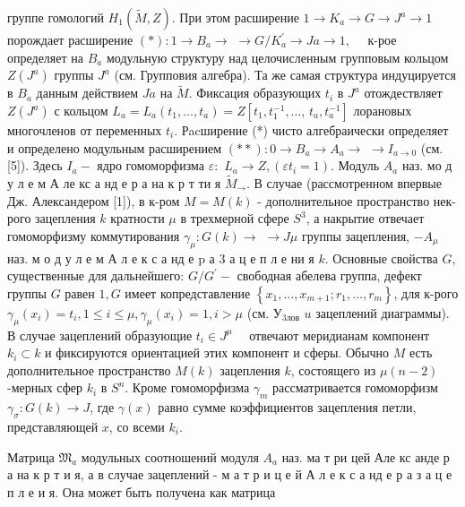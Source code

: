 \documentclass[10pt]{article}
\begin{document}
группе гомологий $H_{1}(\tilde{M}, Z)$. При этом расширение $1 \rightarrow K_{a} \rightarrow G \rightarrow J^{a} \rightarrow 1$ порождает расширение $(*): 1 \rightarrow B_{a} \rightarrow$ $\rightarrow G / K_{a}^{\prime} \rightarrow J a \rightarrow 1, \quad$ к-рое определяет на $B_{a}$ модульную структуру над целочисленным групповым кольцом $Z\left(J^{a}\right)$ группы $J^{a}$ (см. Групповия алгебра). Та же самая структура индуцируется в $B_{a}$ данным действием $J a$ на $\tilde{M}$. Фиксация образующих $t_{i}$ в $J^{a}$ отождествляет $Z\left(J^{a}\right)$ с кольцом $L_{a}=L_{a}\left(t_{1}, \ldots, t_{a}\right)=Z\left[t_{1}, t_{1}^{-1}, \ldots\right.$, $\left.t_{a}, t_{a}^{-1}\right]$ лорановых многочленов от переменных $t_{i}$. Рacширение (*) чисто алгебраически определяет и определено модульным расширением $(* *): 0 \rightarrow B_{a} \rightarrow A_{a} \rightarrow$ $\rightarrow I_{a \rightarrow 0}$ (см. [5]). Здесь $I_{a}-$ ядро гомоморфизма $\varepsilon:$ $L_{a} \rightarrow Z,\left(\varepsilon t_{i}=1\right)$. Модуль $A_{a}$ наз. мо д у л е м А ле кс а нд е р а на к р т ти я $\tilde{M}_{\rightarrow}$. В случае (рассмотренном впервые Дж. Александером [1]), в к-ром $M=M(k)$ - дополнительное пространство нек-рого зацепления $k$ кратности $\mu$ в трехмерной сфере $S^{3}$, а накрытие отвечает гомоморфизму коммутирования $\gamma_{\mu}: G(k) \rightarrow$ $\rightarrow J \mu$ группы зацепления, $-A_{\mu}$ наз. м о д у л е м А л е к с а нд е $\mathrm{p}$ а 3 а ц е п л е ни я $k$. Основные свойства $G$, существенные для дальнейшего: $G / G^{\prime}-$ свободная абелева группа, дефект группы $G$ равен $1, G$ имеет копредставление $\left\{x_{1}, \ldots, x_{m+1} ; r_{1}, \ldots, r_{m}\right\}$, для к-рого $\gamma_{\mu}\left(x_{i}\right)=t_{i}, 1 \leqslant i \leqslant \mu, \gamma_{\mu}\left(x_{i}\right)=1, i>\mu$ (см. $У_{3 л о в}$ $u$ зацеплений диаграммы). В случае зацеплений образующие $t_{i} \in J^{\mu} \quad$ отвечают меридианам компонент $k_{i} \subset k$ и фиксируются ориентацией этих компонент и сферы. Обычно $M$ есть дополнительное пространство $M(k)$ зацепления $k$, состоящего из $\mu(n-2)$-мерных сфер $k_{i}$ в $S^{n}$. Кроме гомоморфизма $\gamma_{m}$ рассматривается гомоморфизм $\gamma_{\sigma}: G(k) \rightarrow J$, где $\gamma(x)$ равно сумме коэффициентов зацепления петли, представляющей $x$, со всеми $k_{i}$.



Матрица $\mathfrak{M}_{a}$ модульных соотношений модуля $A_{a}$ наз. ма т ри цей Але кс анде р а на к р т и я, а в случае зацеплений - м а т р и ц е й А л е к с а нд е р а з а ц е п л е и я. Она может быть получена как матрица
\end{document}
